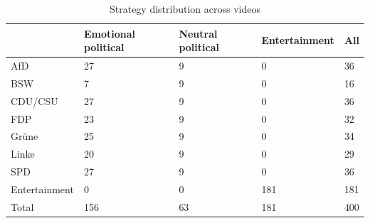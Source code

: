\begin{table}[ht]
\centering
\begin{tabular}{|l|l|l|l|l|}
\hline
 & \textbf{Emotional political} & \textbf{Neutral political} & \textbf{Entertainment} & \textbf{All} \\ \hline
AfD & 27 & 9 & 0 & 36 \\ \hline
BSW & 7 & 9 & 0 & 16 \\ \hline
CDU/CSU & 27 & 9 & 0 & 36 \\ \hline
FDP & 23 & 9 & 0 & 32 \\ \hline
Grüne & 25 & 9 & 0 & 34 \\ \hline
Linke & 20 & 9 & 0 & 29 \\ \hline
SPD & 27 & 9 & 0 & 36 \\ \hline
Entertainment & 0 & 0 & 181 & 181 \\ \hline
Total & 156 & 63 & 181 & 400 \\ \hline
\end{tabular}
\caption{Strategy distribution across videos}
\label{tiktok:strategy}
\end{table}
